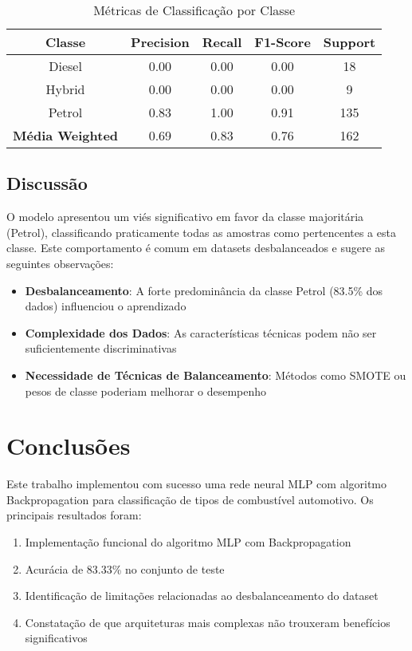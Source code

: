 \documentclass[12pt]{article}
\begin{document}
\begin{table}[H]
\centering
\caption{Métricas de Classificação por Classe}
\label{tab:classificacao}
\begin{tabular}{|c|c|c|c|c|}
\hline
\textbf{Classe} & \textbf{Precision} & \textbf{Recall} & \textbf{F1-Score} & \textbf{Support} \\
\hline
Diesel & 0.00 & 0.00 & 0.00 & 18 \\
Hybrid & 0.00 & 0.00 & 0.00 & 9 \\
Petrol & 0.83 & 1.00 & 0.91 & 135 \\
\hline
\textbf{Média Weighted} & 0.69 & 0.83 & 0.76 & 162 \\
\hline
\end{tabular}
\end{table}

\subsection{Discussão}

O modelo apresentou um viés significativo em favor da classe majoritária (Petrol), classificando praticamente todas as amostras como pertencentes a esta classe. Este comportamento é comum em datasets desbalanceados e sugere as seguintes observações:

\begin{itemize}
    \item \textbf{Desbalanceamento}: A forte predominância da classe Petrol (83.5\% dos dados) influenciou o aprendizado
    \item \textbf{Complexidade dos Dados}: As características técnicas podem não ser suficientemente discriminativas
    \item \textbf{Necessidade de Técnicas de Balanceamento}: Métodos como SMOTE ou pesos de classe poderiam melhorar o desempenho
\end{itemize}

\section{Conclusões}

Este trabalho implementou com sucesso uma rede neural MLP com algoritmo Backpropagation para classificação de tipos de combustível automotivo. Os principais resultados foram:

\begin{enumerate}
    \item Implementação funcional do algoritmo MLP com Backpropagation
    \item Acurácia de 83.33\% no conjunto de teste
    \item Identificação de limitações relacionadas ao desbalanceamento do dataset
    \item Constatação de que arquiteturas mais complexas não trouxeram benefícios significativos
\end{enumerate}
\end{document}
